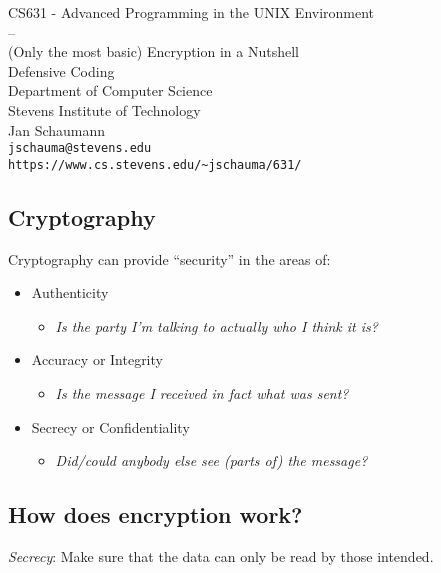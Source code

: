 \documentclass[xga]{xdvislides}
\begin{document}
\setfontphv

\lhead{\slidetitle}
\cfoot{\relax}
\rfoot{\Gray{\today}}

\vspace*{\fill}
\begin{center}
	\Hugesize
		CS631 - Advanced Programming in the UNIX Environment\\
		-- \\
		(Only the most basic) Encryption in a Nutshell \\
		Defensive Coding
	\hspace*{5mm}\blueline\\ [1em]
	\Normalsize
		Department of Computer Science\\
		Stevens Institute of Technology\\
		Jan Schaumann\\
		\verb+jschauma@stevens.edu+\\
		\verb+https://www.cs.stevens.edu/~jschauma/631/+
\end{center}
\vspace*{\fill}

\subsection{Cryptography}
Cryptography can provide ``security'' in the areas of:
\begin{itemize}
	\item Authenticity
		\begin{itemize}
			\item {\em Is the party I'm talking to actually who I {\em think} it is?}
		\end{itemize}
	\item Accuracy or Integrity
		\begin{itemize}
			\item {\em Is the message I received in fact what was sent?}
		\end{itemize}
	\item Secrecy or Confidentiality
		\begin{itemize}
			\item {\em Did/could anybody else see (parts of) the message?}
		\end{itemize}
\end{itemize}


\subsection{How does encryption work?}
{\em Secrecy}:  Make sure that the data can only be read by those intended.
\end{document}
